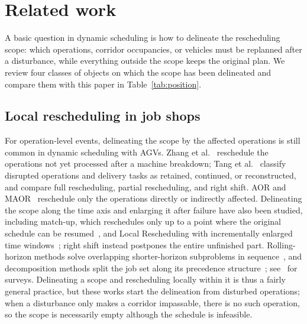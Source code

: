 \documentclass[manuscript,screen,review]{acmart}
\begin{document}
\section{Related work}
\label{sec:related_work}

A basic question in dynamic scheduling is how to delineate the rescheduling scope: which operations, corridor occupancies, or vehicles must be replanned after a disturbance, while everything outside the scope keeps the original plan.
We review four classes of objects on which the scope has been delineated and compare them with this paper in Table~\ref{tab:position}.

\subsection{Local rescheduling in job shops}
\label{sec:rw_aor}

For operation-level events, delineating the scope by the affected operations is still common in dynamic scheduling with AGVs.
Zhang et al.~\cite{zhang2023energy} reschedule the operations not yet processed after a machine breakdown;
Tang et al.~\cite{tang2026dynamic} classify disrupted operations and delivery tasks as retained, continued, or reconstructed, and compare full rescheduling, partial rescheduling, and right shift.
AOR and MAOR~\cite{subramaniam2003maor} reschedule only the operations directly or indirectly affected.
Delineating the scope along the time axis and enlarging it after failure have also been studied, including match-up, which reschedules only up to a point where the original schedule can be resumed~\cite{qiao2012single,salido2017rescheduling},
and Local Rescheduling with incrementally enlarged time windows~\cite{kuster2007local}; right shift instead postpones the entire unfinished part.
Rolling-horizon methods solve overlapping shorter-horizon subproblems in sequence~\cite{li2025learning}, and decomposition methods split the job set along its precedence structure~\cite{margot2003decompositions}; see~\cite{vieira2003rescheduling,ouelhadj2009survey} for surveys.
Delineating a scope and rescheduling locally within it is thus a fairly general practice, but these works start the delineation from disturbed operations;
when a disturbance only makes a corridor impassable, there is no such operation, so the scope is necessarily empty although the schedule is infeasible.
\end{document}
